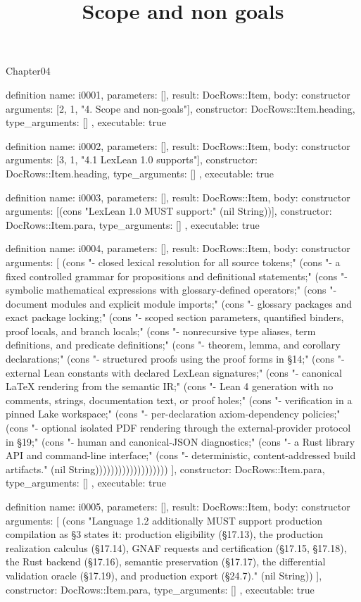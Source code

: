 \begin{lexlean}{Chapter04}
\title{Scope and non goals}
\begin{semanticmodule}
definition{
  name: i0001,
  parameters: [],
  result: DocRows::Item,
  body: constructor{
    arguments: [2, 1, "4. Scope and non-goals"],
    constructor: DocRows::Item.heading,
    type_arguments: []
  },
  executable: true
}

definition{
  name: i0002,
  parameters: [],
  result: DocRows::Item,
  body: constructor{
    arguments: [3, 1, "4.1 LexLean 1.0 supports"],
    constructor: DocRows::Item.heading,
    type_arguments: []
  },
  executable: true
}

definition{
  name: i0003,
  parameters: [],
  result: DocRows::Item,
  body: constructor{
    arguments: [(cons "LexLean 1.0 MUST support:" (nil String))],
    constructor: DocRows::Item.para,
    type_arguments: []
  },
  executable: true
}

definition{
  name: i0004,
  parameters: [],
  result: DocRows::Item,
  body: constructor{
    arguments: [
      (cons "- closed lexical resolution for all source tokens;" (cons "- a fixed controlled grammar for propositions and definitional statements;" (cons "- symbolic mathematical expressions with glossary-defined operators;" (cons "- document modules and explicit module imports;" (cons "- glossary packages and exact package locking;" (cons "- scoped section parameters, quantified binders, proof locals, and branch locals;" (cons "- nonrecursive type aliases, term definitions, and predicate definitions;" (cons "- theorem, lemma, and corollary declarations;" (cons "- structured proofs using the proof forms in §14;" (cons "- external Lean constants with declared LexLean signatures;" (cons "- canonical LaTeX rendering from the semantic IR;" (cons "- Lean 4 generation with no comments, strings, documentation text, or proof holes;" (cons "- verification in a pinned Lake workspace;" (cons "- per-declaration axiom-dependency policies;" (cons "- optional isolated PDF rendering through the external-provider protocol in §19;" (cons "- human and canonical-JSON diagnostics;" (cons "- a Rust library API and command-line interface;" (cons "- deterministic, content-addressed build artifacts." (nil String)))))))))))))))))))
    ],
    constructor: DocRows::Item.para,
    type_arguments: []
  },
  executable: true
}

definition{
  name: i0005,
  parameters: [],
  result: DocRows::Item,
  body: constructor{
    arguments: [
      (cons "Language 1.2 additionally MUST support production compilation as §3 states it: production eligibility (§17.13), the production realization calculus (§17.14), GNAF requests and certification (§17.15, §17.18), the Rust backend (§17.16), semantic preservation (§17.17), the differential validation oracle (§17.19), and production export (§24.7)." (nil String))
    ],
    constructor: DocRows::Item.para,
    type_arguments: []
  },
  executable: true
}


\end{semanticmodule}
\end{lexlean}

